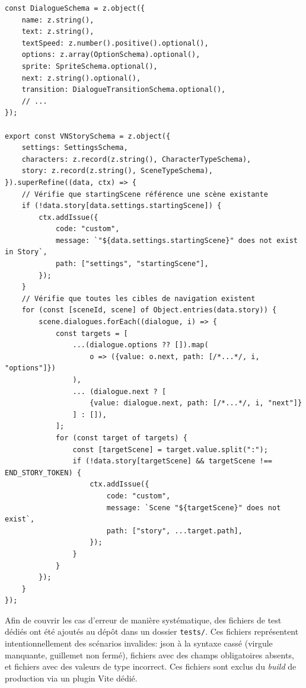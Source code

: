 \begin{listing}[H]
\begin{verbatim}
const DialogueSchema = z.object({
    name: z.string(),
    text: z.string(),
    textSpeed: z.number().positive().optional(),
    options: z.array(OptionSchema).optional(),
    sprite: SpriteSchema.optional(),
    next: z.string().optional(),
    transition: DialogueTransitionSchema.optional(),
    // ...
});

export const VNStorySchema = z.object({
    settings: SettingsSchema,
    characters: z.record(z.string(), CharacterTypeSchema),
    story: z.record(z.string(), SceneTypeSchema),
}).superRefine((data, ctx) => {
    // Vérifie que startingScene référence une scène existante
    if (!data.story[data.settings.startingScene]) {
        ctx.addIssue({
            code: "custom",
            message: `"${data.settings.startingScene}" does not exist in Story`,
            path: ["settings", "startingScene"],
        });
    }
    // Vérifie que toutes les cibles de navigation existent
    for (const [sceneId, scene] of Object.entries(data.story)) {
        scene.dialogues.forEach((dialogue, i) => {
            const targets = [
                ...(dialogue.options ?? []).map(
                    o => ({value: o.next, path: [/*...*/, i, "options"]})
                ),
                ... (dialogue.next ? [
                    {value: dialogue.next, path: [/*...*/, i, "next"]}
                ] : []),
            ];
            for (const target of targets) {
                const [targetScene] = target.value.split(":");
                if (!data.story[targetScene] && targetScene !== END_STORY_TOKEN) {
                    ctx.addIssue({
                        code: "custom",
                        message: `Scene "${targetScene}" does not exist`,
                        path: ["story", ...target.path],
                    });
                }
            }
        });
    }
});
\end{verbatim}
\caption{Extrait du \texttt{VNStorySchema}: validation déclarative et vérification sémantique des références de navigation (Auteur 2026)}
\label{lst:storyschema}
\end{listing}

Afin de couvrir les cas d'erreur de manière systématique, des fichiers de test dédiés ont été ajoutés au dépôt dans un dossier \texttt{tests/}. Ces fichiers représentent intentionnellement des scénarios invalides: \acrshort{json} à la \gls{syntaxe} cassé (virgule manquante, guillemet non fermé), fichiers avec des champs obligatoires absents, et fichiers avec des valeurs de type incorrect. Ces fichiers sont exclus du \textit{build} de production via un \gls{plugin} Vite dédié.


